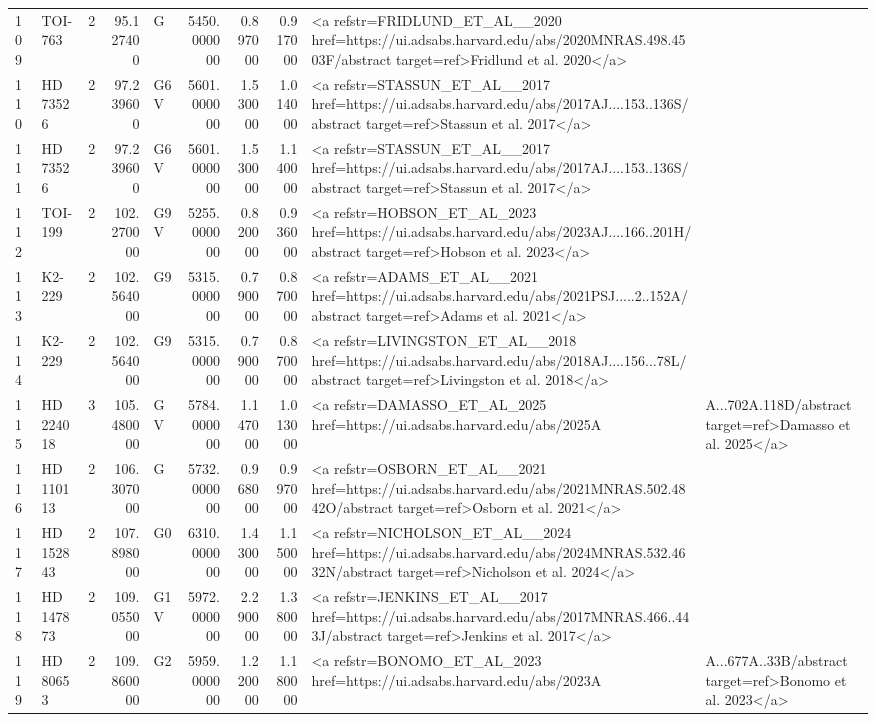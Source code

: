 \begin{tabular}{llrrlrrrl}
109 & TOI-763 & 2 & 95.127400 & G & 5450.000000 & 0.897000 & 0.917000 & <a refstr=FRIDLUND_ET_AL__2020 href=https://ui.adsabs.harvard.edu/abs/2020MNRAS.498.4503F/abstract target=ref>Fridlund et al. 2020</a> \\
110 & HD 73526 & 2 & 97.239600 & G6 V & 5601.000000 & 1.530000 & 1.014000 & <a refstr=STASSUN_ET_AL__2017 href=https://ui.adsabs.harvard.edu/abs/2017AJ....153..136S/abstract target=ref>Stassun et al. 2017</a> \\
111 & HD 73526 & 2 & 97.239600 & G6 V & 5601.000000 & 1.530000 & 1.140000 & <a refstr=STASSUN_ET_AL__2017 href=https://ui.adsabs.harvard.edu/abs/2017AJ....153..136S/abstract target=ref>Stassun et al. 2017</a> \\
112 & TOI-199 & 2 & 102.270000 & G9 V & 5255.000000 & 0.820000 & 0.936000 & <a refstr=HOBSON_ET_AL_2023 href=https://ui.adsabs.harvard.edu/abs/2023AJ....166..201H/abstract target=ref>Hobson et al. 2023</a> \\
113 & K2-229 & 2 & 102.564000 & G9 & 5315.000000 & 0.790000 & 0.870000 & <a refstr=ADAMS_ET_AL__2021 href=https://ui.adsabs.harvard.edu/abs/2021PSJ.....2..152A/abstract target=ref>Adams et al. 2021</a> \\
114 & K2-229 & 2 & 102.564000 & G9 & 5315.000000 & 0.790000 & 0.870000 & <a refstr=LIVINGSTON_ET_AL__2018 href=https://ui.adsabs.harvard.edu/abs/2018AJ....156...78L/abstract target=ref>Livingston et al. 2018</a> \\
115 & HD 224018 & 3 & 105.480000 & G V & 5784.000000 & 1.147000 & 1.013000 & <a refstr=DAMASSO_ET_AL_2025 href=https://ui.adsabs.harvard.edu/abs/2025A&A...702A.118D/abstract target=ref>Damasso et al. 2025</a> \\
116 & HD 110113 & 2 & 106.307000 & G & 5732.000000 & 0.968000 & 0.997000 & <a refstr=OSBORN_ET_AL__2021 href=https://ui.adsabs.harvard.edu/abs/2021MNRAS.502.4842O/abstract target=ref>Osborn et al. 2021</a> \\
117 & HD 152843 & 2 & 107.898000 & G0 & 6310.000000 & 1.430000 & 1.150000 & <a refstr=NICHOLSON_ET_AL__2024 href=https://ui.adsabs.harvard.edu/abs/2024MNRAS.532.4632N/abstract target=ref>Nicholson et al. 2024</a> \\
118 & HD 147873 & 2 & 109.055000 & G1 V & 5972.000000 & 2.290000 & 1.380000 & <a refstr=JENKINS_ET_AL__2017 href=https://ui.adsabs.harvard.edu/abs/2017MNRAS.466..443J/abstract target=ref>Jenkins et al. 2017</a> \\
119 & HD 80653 & 2 & 109.860000 & G2 & 5959.000000 & 1.220000 & 1.180000 & <a refstr=BONOMO_ET_AL_2023 href=https://ui.adsabs.harvard.edu/abs/2023A&A...677A..33B/abstract target=ref>Bonomo et al. 2023</a> \\

\end{tabular}
